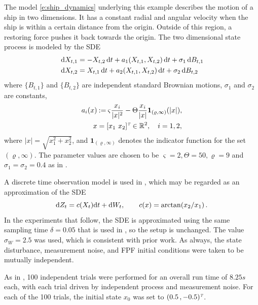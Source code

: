 The model  \eqref{e:ship_dynamics}
underlying this example  describes the motion of a ship in two dimensions.  It has
a constant radial and angular velocity when the ship is within a certain distance from the origin.  Outside of this region, a
restoring force pushes it back towards the origin. The two dimensional state process is modeled by the SDE
\begin{equation}
\begin{aligned}
\rmd X_{t,1} & = - X_{t,2} \rmd t + a_1(X_{t,1}, X_{t,2}) \rmd t + \sigma_1 \rmd B_{t ,1}\\
\rmd X_{t,2} & = X_{t,1} \rmd t + a_2(X_{t,1}, X_{t,2}) \rmd t + \sigma_2 \rmd B_{t,2}
\label{e:ship_dynamics}
\end{aligned}
\end{equation}
where $\{B_{t,1}\}$ and $\{B_{t,2}\}$ are independent standard Brownian motions, $\sigma_1$ and $\sigma_2$ are constants,
\[
\begin{aligned}
a_i(x) & \mathbin{:=} \varsigma \frac{x_i}{|x|^2} - \Theta \frac{x_i}{|x|}\mathbf{1}_{(\varrho,\infty)}(|x|),\\
x & = [x_1\,\, x_2]^{\hbox{\tiny\it T}} \in \mathbb{R}^2, \quad i=1,2,
\end{aligned}
\]
where $|x| = \sqrt{x_1^2 + x_2^2}$, and
$\mathbf{1}_{(\varrho,\infty)}$ denotes the indicator function for the set $(\varrho, \infty)$. The parameter values are chosen to be $\varsigma = 2, \Theta  = 50, \varrho = 9$ and $\sigma_1=\sigma_2=0.4$ as in \cite{budchelee07,tilghiomeh13}.

A discrete time observation model is used in \cite{budchelee07}, which may be regarded as an approximation of the
SDE
\[
\text{d} Z_t = c(X_t)\text{d} t + \text{d} W_t,\qquad   c(x) = \arctan(x_2/x_1)\, .
\]
In the experiments that follow, the SDE is approximated using the same sampling time $\delta =0.05$ that is used in  \cite{budchelee07}, so the setup is unchanged.   The value $\sigma_W =2.5$ was used, which is consistent with prior work.
As always, the state disturbance, measurement noise,  and FPF initial conditions were taken to be mutually independent.


As in \cite{budchelee07,tilghiomeh13}, 100 independent trials were performed for an overall run time of $8.25s$ each,
with each trial driven by independent process and measurement noise. For each of the 100 trials, the initial state $x_0$ was set to $(0.5 \, , -0.5)^{\hbox{\tiny\it T}}$.

